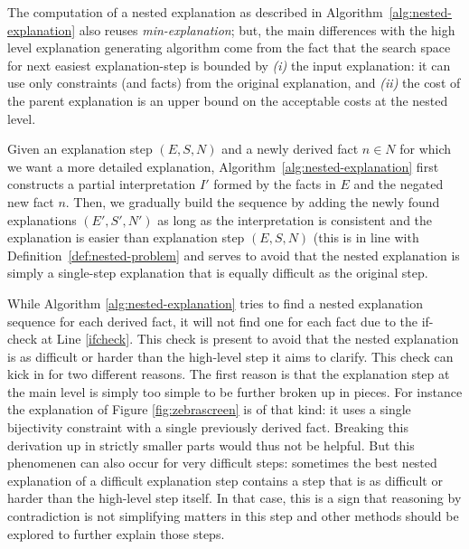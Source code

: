 The computation of a nested explanation as described in Algorithm~\ref{alg:nested-explanation} also reuses \textit{min-explanation}; but, the main differences with the high level explanation generating algorithm come from the fact that the search space for next easiest explanation-step is bounded by \emph{(i)} the input explanation: it can use only constraints (and facts) from the original explanation, and \emph{(ii)} the cost of the parent explanation is an upper bound on the acceptable costs at the nested level. 

Given an explanation step $(E, S, N)$ and a newly derived fact $n \in N$ for which we want a more detailed explanation, Algorithm~\ref{alg:nested-explanation} first constructs a partial interpretation $I'$ formed by the facts in $E$ and the negated new fact $n$. 
Then, we gradually build the sequence by adding the newly found explanations $(E', S', N')$ as long as the interpretation is consistent and the explanation is easier than explanation step $(E, S, N)$ (this is in line with Definition~\ref{def:nested-problem} and serves to avoid that the nested explanation is simply a single-step explanation that is equally difficult as the original step.  

While Algorithm \ref{alg:nested-explanation} tries to find a nested explanation sequence for each derived fact, it will not find one for each fact due to the if-check at Line \ref{ifcheck}. This check is present to avoid that the nested explanation is as difficult or harder than the high-level step it aims to clarify. This check can kick in for two different reasons. The first reason is that the explanation step at the main level is simply too simple to be further broken up in pieces. For instance the explanation of Figure \ref{fig:zebrascreen} is of that kind: it uses a single bijectivity constraint with a single previously derived fact. Breaking this derivation up in strictly smaller parts would thus not be helpful. But this phenomenen can also occur for very difficult steps: sometimes the best nested explanation of a difficult explanation step contains a step that is as difficult or harder than the high-level step itself. In that case, this is a sign that reasoning by contradiction is not simplifying matters in this step and other methods should be explored to further explain those steps. 

